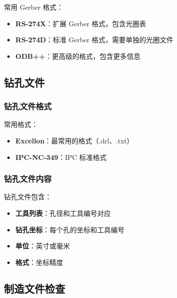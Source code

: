 常用 Gerber 格式：

\begin{itemize}
  \item \textbf{RS-274X}：扩展 Gerber 格式，包含光圈表
  \item \textbf{RS-274D}：标准 Gerber 格式，需要单独的光圈文件
  \item \textbf{ODB++}：更高级的格式，包含更多信息
\end{itemize}

\subsection{钻孔文件}

\subsubsection{钻孔文件格式}

常用格式：

\begin{itemize}
  \item \textbf{Excellon}：最常用的格式（.drl、.txt）
  \item \textbf{IPC-NC-349}：IPC 标准格式
\end{itemize}

\subsubsection{钻孔文件内容}

钻孔文件包含：

\begin{itemize}
  \item \textbf{工具列表}：孔径和工具编号对应
  \item \textbf{钻孔坐标}：每个孔的坐标和工具编号
  \item \textbf{单位}：英寸或毫米
  \item \textbf{格式}：坐标精度
\end{itemize}

\subsection{制造文件检查}


